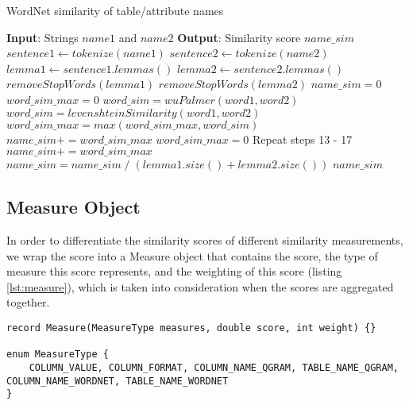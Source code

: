 \begin{algorithm}
    \caption{WordNet similarity of table/attribute names}
    \label{alg:wordnet}
    \begin{algorithmic}[1]
\STATE \textbf{Input}: Strings $name1$ and $name2$
\STATE \textbf{Output}: Similarity score $name\_sim$
\STATE $sentence1 \gets tokenize(name1)$
\STATE $sentence2 \gets tokenize(name2)$
\STATE $lemma1 \gets sentence1.lemmas()$
\STATE $lemma2 \gets sentence2.lemmas()$
\STATE $removeStopWords(lemma1)$
\STATE $removeStopWords(lemma2)$
\STATE $name\_sim=0$
\STATE $word\_sim\_max=0$
\STATE $word\_sim=wuPalmer(word1, word2)$
\STATE $word\_sim = levenshteinSimilarity(word1, word2)$
\STATE $word\_sim\_max=max(word\_sim\_max, word\_sim)$
\ENDIF
\ENDFOR
\STATE $name\_sim+=word\_sim\_max$
\ENDFOR
{}
\STATE $word\_sim\_max=0$
\STATE Repeat steps 13 - 17
\ENDFOR
\STATE $name\_sim+=word\_sim\_max$
\ENDFOR
\STATE $name\_sim = name\_sim \; / \; (lemma1.size() + lemma2.size())$
\RETURN $name\_sim$
    \end{algorithmic}
\end{algorithm}

\subsection{Measure Object}\label{measureObject}

In order to differentiate the similarity scores of different similarity measurements, we wrap the score into a Measure object that contains the score, the type of measure this score represents, and the weighting of this score (listing \ref{lst:measure}), which is taken into consideration when the scores are aggregated together. 

\begin{lstlisting}[caption=The measure object,label=lst:measure]
record Measure(MeasureType measures, double score, int weight) {}

enum MeasureType {
    COLUMN_VALUE, COLUMN_FORMAT, COLUMN_NAME_QGRAM, TABLE_NAME_QGRAM, COLUMN_NAME_WORDNET, TABLE_NAME_WORDNET
}
\end{lstlisting}

